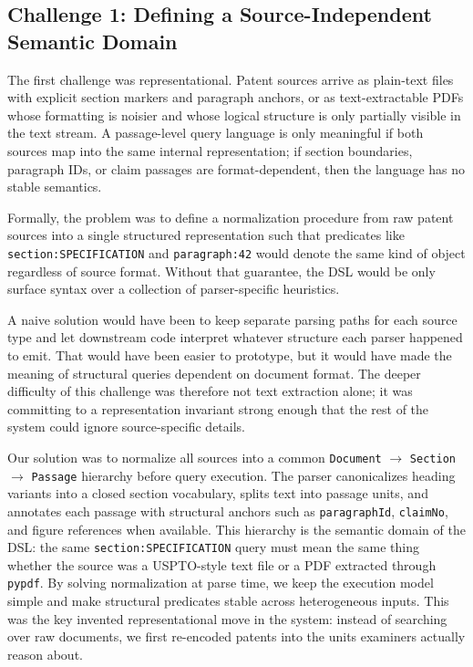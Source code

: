 \documentclass[sigconf]{acmart}
\newcommand{\DocSectionPassage}{\texttt{Document} $\to$ \texttt{Section} $\to$ \texttt{Passage}}
\begin{document}
\subsection{Challenge 1: Defining a Source-Independent Semantic Domain}

The first challenge was representational. Patent sources arrive as plain-text
files with explicit section markers and paragraph anchors, or as
text-extractable PDFs whose formatting is noisier and whose logical structure is
only partially visible in the text stream. A passage-level query language is
only meaningful if both sources map into the same internal representation; if
section boundaries, paragraph IDs, or claim passages are format-dependent, then
the language has no stable semantics.

Formally, the problem was to define a normalization procedure from raw patent
sources into a single structured representation such that predicates like
\texttt{section:SPECIFICATION} and \texttt{paragraph:42} would denote the same
kind of object regardless of source format. Without that guarantee, the DSL
would be only surface syntax over a collection of parser-specific heuristics.

A naive solution would have been to keep separate parsing paths for each source
type and let downstream code interpret whatever structure each parser happened
to emit. That would have been easier to prototype, but it would have made the
meaning of structural queries dependent on document format. The deeper
difficulty of this challenge was therefore not text extraction alone; it was
committing to a representation invariant strong enough that the rest of the
system could ignore source-specific details.

Our solution was to normalize all sources into a common
\DocSectionPassage{} hierarchy before query execution.
The parser canonicalizes heading variants into a closed section vocabulary,
splits text into passage units, and annotates each passage with structural
anchors such as \texttt{paragraphId}, \texttt{claimNo}, and figure references
when available. This hierarchy is the semantic domain of the DSL: the same
\texttt{section:SPECIFICATION} query must mean the same thing whether the source
was a USPTO-style text file or a PDF extracted through \texttt{pypdf}. By
solving normalization at parse time, we keep the execution model simple and make
structural predicates stable across heterogeneous inputs. This was the key
invented representational move in the system: instead of searching over raw
documents, we first re-encoded patents into the units examiners actually reason
about.
\end{document}

